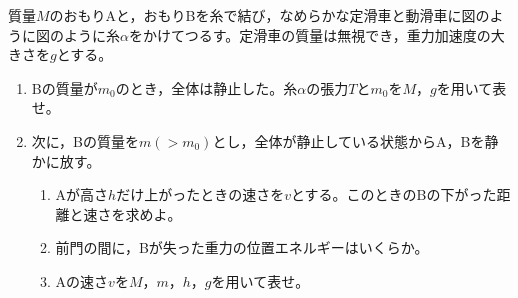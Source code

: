 \item
    \begin{mawarikomi}{80pt}{}
    質量$M$のおもりAと，おもりBを糸で結び，なめらかな定滑車と動滑車に図のように図のように糸$\alpha $をかけてつるす。定滑車の質量は無視でき，重力加速度の大きさを$g$とする。
        \begin{enumerate}
            \item Bの質量が$m_0$のとき，全体は静止した。糸$\alpha $の張力$T$と$m_0$を$M$，$g$を用いて表せ。
            \item 次に，Bの質量を$m(>m_0)$とし，全体が静止している状態からA，Bを静かに放す。
            \begin{enumerate}
                \item Aが高さ$h$だけ上がったときの速さを$v$とする。このときのBの下がった距離と速さを求めよ。
                \item 前門の間に，Bが失った重力の位置エネルギーはいくらか。
                \item Aの速さ$v$を$M$，$m$，$h$，$g$を用いて表せ。
            \end{enumerate}
        \end{enumerate}
    \end{mawarikomi}